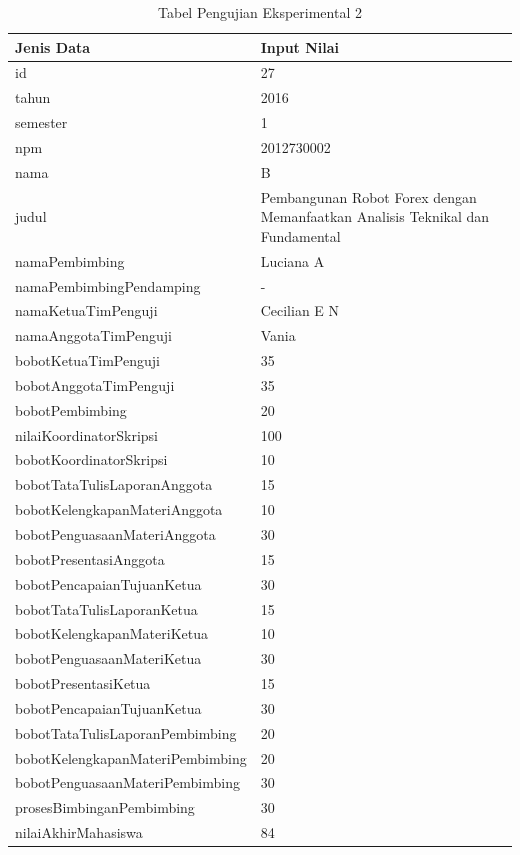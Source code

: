 	\begin{table}[H]
		\centering
		\caption{Tabel Pengujian Eksperimental 2}
		\begin{tabular}{| m{7cm} | m{5cm} |}
			\hline
			Jenis Data & Input Nilai\\
			\hline
			id & 27\\
			\hline
			tahun & 2016\\
			\hline
			semester & 1\\
			\hline
			npm & 2012730002\\
			\hline
			nama & B\\
			\hline
			judul & Pembangunan Robot Forex dengan Memanfaatkan Analisis Teknikal dan Fundamental \\
			\hline
			namaPembimbing & Luciana A\\
			\hline
			namaPembimbingPendamping & -\\
			\hline
			namaKetuaTimPenguji & Cecilian E N\\
			\hline
			namaAnggotaTimPenguji & Vania\\
			\hline
			bobotKetuaTimPenguji & 35\\
			\hline
			bobotAnggotaTimPenguji & 35\\
			\hline
			bobotPembimbing & 20\\
			\hline
			nilaiKoordinatorSkripsi & 100\\
			\hline
			bobotKoordinatorSkripsi & 10\\
			\hline
			bobotTataTulisLaporanAnggota & 15\\
			\hline
			bobotKelengkapanMateriAnggota & 10\\
			\hline
			bobotPenguasaanMateriAnggota & 30\\
			\hline
			bobotPresentasiAnggota & 15\\
			\hline
			bobotPencapaianTujuanKetua & 30\\
			\hline
			bobotTataTulisLaporanKetua & 15\\
			\hline
			bobotKelengkapanMateriKetua & 10\\
			\hline
			bobotPenguasaanMateriKetua & 30\\
			\hline
			bobotPresentasiKetua & 15\\
			\hline
			bobotPencapaianTujuanKetua & 30\\
			\hline
			bobotTataTulisLaporanPembimbing & 20\\
			\hline
			bobotKelengkapanMateriPembimbing &20\\
			\hline
			bobotPenguasaanMateriPembimbing & 30\\
			\hline
			prosesBimbinganPembimbing & 30\\
			\hline
			nilaiAkhirMahasiswa & 84\\
			\hline
		\end{tabular}
	\end{table}
